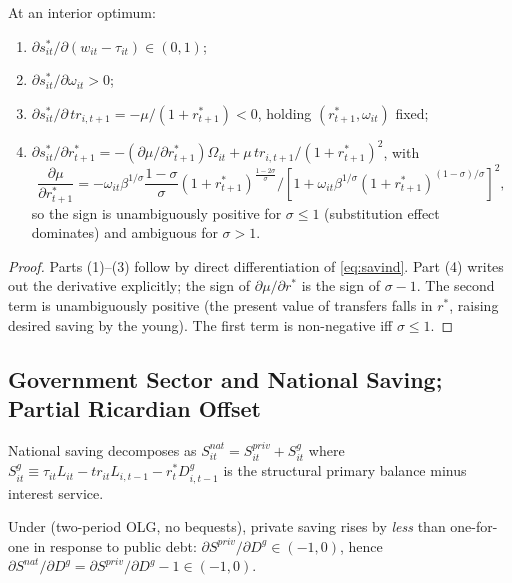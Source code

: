 \begin{proposition}\label{prop:indiv-saving}
At an interior optimum:
\begin{enumerate}
\item $\partial s_{it}^*/\partial(w_{it}-\tau_{it})\in(0,1)$;
\item $\partial s_{it}^*/\partial \omega_{it}>0$;
\item $\partial s_{it}^*/\partial \,tr_{i,t+1}=-\mu/(1+r_{t+1}^*)<0$,
holding $(r_{t+1}^*,\omega_{it})$ fixed;
\item $\partial s_{it}^*/\partial r_{t+1}^*=-(\partial\mu/\partial r_{t+1}^*)\Omega_{it}+\mu\,tr_{i,t+1}/(1+r_{t+1}^*)^2$, with
\[
\frac{\partial\mu}{\partial r_{t+1}^*}=-\omega_{it}\beta^{1/\sigma}\frac{1-\sigma}{\sigma}(1+r_{t+1}^*)^{\frac{1-2\sigma}{\sigma}}\Big/[1+\omega_{it}\beta^{1/\sigma}(1+r_{t+1}^*)^{(1-\sigma)/\sigma}]^2,
\]
so the sign is unambiguously positive for $\sigma\le 1$ (substitution effect
dominates) and ambiguous for $\sigma>1$.
\end{enumerate}
\end{proposition}

\begin{proof}
Parts (1)--(3) follow by direct differentiation of \eqref{eq:savind}.
Part (4) writes out the derivative explicitly; the sign of $\partial\mu/\partial r^*$ is the sign of $\sigma-1$. The second term is unambiguously positive (the present value of transfers falls in $r^*$, raising desired saving by the young). The first term is non-negative iff $\sigma\le 1$.
\end{proof}

\subsection{Government Sector and National Saving; Partial Ricardian Offset}
\label{sec:theory:gov}

National saving decomposes as
$S_{it}^{nat}=S_{it}^{priv}+S_{it}^g$ where $S_{it}^g\equiv \tau_{it}L_{it}-tr_{it}L_{i,t-1}-r_t^*D_{i,t-1}^g$ is the structural primary balance minus interest service.

\begin{remark}\label{rem:ricardian}
Under  (two-period OLG, no bequests), private
saving rises by \emph{less} than one-for-one in response to public debt:
$\partial S^{priv}/\partial D^g\in (-1,0)$, hence
$\partial S^{nat}/\partial D^g=\partial S^{priv}/\partial D^g-1\in(-1,0)$.
\end{remark}


